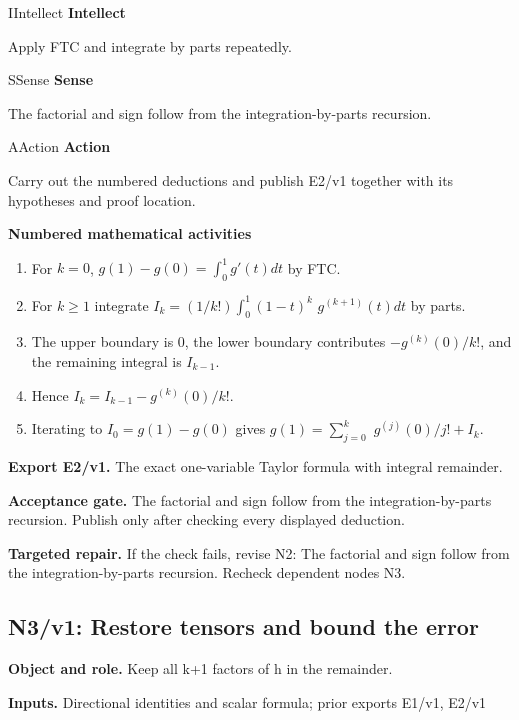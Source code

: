 \documentclass[preprint,12pt,aps,pra,showkeys,amsmath,amssymb,superscriptaddress,floatfix]{revtex4-2}
\theoremstyle{definition}
\theoremstyle{remark}
\newcommand{\mmfaculty}[3]{%
 \begin{mmfacultybox}{#1}{#2}
 {\sffamily\bfseries\color{MMBlue}#2}\par\smallskip #3
 \end{mmfacultybox}}
\newcommand{\field}[2]{\par\smallskip\noindent\textbf{#1.} #2\par}
\begin{document}
\mmfaculty{I}{Intellect}{Apply FTC and integrate by parts repeatedly.}

\mmfaculty{S}{Sense}{The factorial and sign follow from the integration-by-parts recursion.}

\mmfaculty{A}{Action}{Carry out the numbered deductions and publish E2/v1 together with its
hypotheses and proof location.}

\smallskip\noindent\textbf{Numbered mathematical activities}

\begin{enumerate}[label=N2.\arabic*,leftmargin=3.4em]

\item For \(k=0\), \(g(1)-g(0)=\int _{0}^{1}g'(t)dt\) by FTC.

\item For \(k\ge 1\) integrate \(I_k=(1/k!)\int _{0}^{1}(1-t)^k\)
\(g^{(k+1)}(t)dt\) by parts.

\item The upper boundary is 0, the lower boundary contributes
\(-g^{(k)}(0)/k!\), and the remaining integral is \(I_{k-1}\).

\item Hence \(I_k=I_{k-1}-g^{(k)}(0)/k!\).

\item Iterating to \(I_{0}=g(1)-g(0)\) gives \(g(1)=\sum _{j=0}^k\)
\(g^{(j)}(0)/j!+I_k\).

\end{enumerate}

\field{Export E2/v1}{The exact one-variable Taylor formula with integral remainder.}

\field{Acceptance gate}{The factorial and sign follow from the integration-by-parts recursion.
Publish only after checking every displayed deduction.}

\field{Targeted repair}{If the check fails, revise N2: The factorial and sign follow from the
integration-by-parts recursion. Recheck dependent nodes N3.}

\clearpage

\subsection{N3/v1: Restore tensors and bound the error}

\field{Object and role}{Keep all k+1 factors of h in the remainder.}

\field{Inputs}{Directional identities and scalar formula; prior exports E1/v1, E2/v1}
\end{document}
